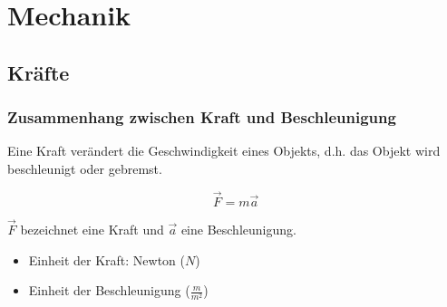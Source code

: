 \section{Mechanik}
\subsection{Kräfte}
\subsubsection{Zusammenhang zwischen Kraft und Beschleunigung}%
\label{ssub:Zusammenhang zwischen Kraft und Beschleunigung}

Eine Kraft verändert die Geschwindigkeit eines Objekts, d.h. das Objekt wird beschleunigt oder gebremst.

\begin{equation*}
  \vec{F} = m\vec{a}
\end{equation*}

$\vec{F}$ bezeichnet eine Kraft und $\vec{a}$ eine Beschleunigung.
\begin{itemize}
  \item Einheit der Kraft: Newton ($N$)
  \item Einheit der Beschleunigung ($\frac{m}{m^2}$)
\end{itemize}
